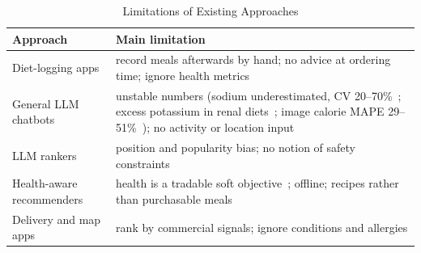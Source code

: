 \begin{table}[t]
    \centering
    \caption{Limitations of Existing Approaches}
    \label{tab:related}
    \footnotesize
    \setlength{\tabcolsep}{3pt}
    \begin{tabular}{@{}p{2.0cm}p{6.0cm}@{}}
        \toprule
        Approach & Main limitation \\
        \midrule
        Diet-logging apps & record meals afterwards by hand; no advice at
            ordering time; ignore health metrics \\
        General LLM chatbots & unstable numbers (sodium underestimated, CV
            20--70\%~\cite{hsuan2025mealbox}; excess potassium in renal
            diets~\cite{aydincil2026renal}; image calorie MAPE
            29--51\%~\cite{bhatambarekar2025multimodal}); no activity or
            location input \\
        LLM rankers & position and popularity bias; no notion of safety
            constraints~\cite{hou2024llmrank} \\
        Health-aware recommenders & health is a tradable soft
            objective~\cite{vasantlal2026morla2c}; offline; recipes rather than
            purchasable meals~\cite{zhang2025mopihfrs,mohbat2025kerl} \\
        Delivery and map apps & rank by commercial signals; ignore conditions
            and allergies \\
        \bottomrule
    \end{tabular}
\end{table}
